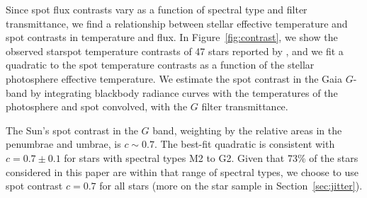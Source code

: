 Since spot flux contrasts vary as a function of spectral type and filter transmittance, we find a relationship between stellar effective temperature and spot contrasts in temperature and flux. In Figure~\ref{fig:contrast}, we show the observed starspot temperature contrasts of 47 stars reported by \citet{Berdyugina2005}, and we fit a quadratic to the spot temperature contrasts as a function of the stellar photosphere effective temperature. We estimate the spot contrast in the Gaia $G$-band by integrating blackbody radiance curves with the temperatures of the photosphere and spot convolved, with the $G$ filter transmittance.

The Sun's spot contrast in the $G$ band, weighting by the relative areas in the penumbrae and umbrae, is $c\sim0.7$. The best-fit quadratic is consistent with $c = 0.7 \pm 0.1$ for stars with spectral types M2 to G2. Given that 73\% of the stars considered in this paper are within that range of spectral types, we choose to use spot contrast $c=0.7$ for all stars (more on the star sample in Section~\ref{sec:jitter}).


